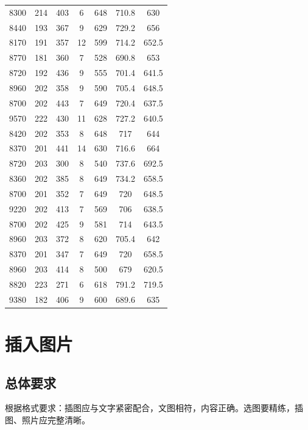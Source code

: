 \begin{longtable}{ccccccc}
      8300  & 214   & 403   & 6     & 648   & 710.8 & 630 \\
      8440  & 193   & 367   & 9     & 629   & 729.2 & 656 \\
      8170  & 191   & 357   & 12    & 599   & 714.2 & 652.5 \\
      8770  & 181   & 360   & 7     & 528   & 690.8 & 653 \\
      8720  & 192   & 436   & 9     & 555   & 701.4 & 641.5 \\
      8960  & 202   & 358   & 9     & 590   & 705.4 & 648.5 \\
      8700  & 202   & 443   & 7     & 649   & 720.4 & 637.5 \\
      9570  & 222   & 430   & 11    & 628   & 727.2 & 640.5 \\
      8420  & 202   & 353   & 8     & 648   & 717   & 644 \\
      8370  & 201   & 441   & 14    & 630   & 716.6 & 664 \\
      8720  & 203   & 300   & 8     & 540   & 737.6 & 692.5 \\
      8360  & 202   & 385   & 8     & 649   & 734.2 & 658.5 \\
      8700  & 201   & 352   & 7     & 649   & 720   & 648.5 \\
      9220  & 202   & 413   & 7     & 569   & 706   & 638.5 \\
      8700  & 202   & 425   & 9     & 581   & 714   & 643.5 \\
      8960  & 203   & 372   & 8     & 620   & 705.4 & 642 \\
      8370  & 201   & 347   & 7     & 649   & 720   & 658.5 \\
      8960  & 203   & 414   & 8     & 500   & 679   & 620.5 \\
      8820  & 223   & 271   & 6     & 618   & 791.2 & 719.5 \\
      9380  & 182   & 406   & 9     & 600   & 689.6 & 635 \\
\end{longtable}

\section{插入图片}

\subsection{总体要求}

根据格式要求：插图应与文字紧密配合，文图相符，内容正确。选图要精练，插图、照片应完整清晰。


